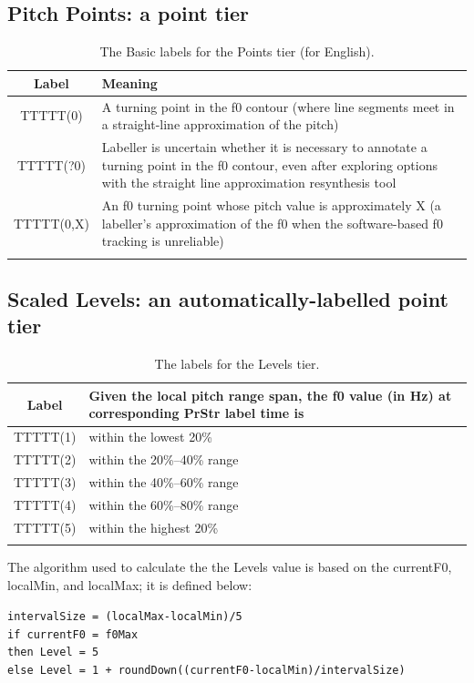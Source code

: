\documentclass[11pt, twoside]{memoir}
\begin{document}
\subsection*{Pitch Points: a point tier}
\begin{longtable}{cp{.8\linewidth}} \toprule \textbf{Label} & \textbf{Meaning} \tabularnewline
\midrule \endhead
TTTTT(0) & A turning point in the f0 contour (where line segments meet in a straight-line approximation of the pitch) \tabularnewline
TTTTT(?0) & Labeller is uncertain whether it is necessary to annotate a turning point in the f0 contour, even after exploring options with the straight line approximation resynthesis tool \tabularnewline
TTTTT(0,X) & An f0 turning point whose pitch value is approximately X (a labeller’s approximation of the f0 when the software-based f0 tracking is unreliable) \tabularnewline
\bottomrule 
\caption{The Basic labels for the Points tier (for English).%
}
\end{longtable}

\subsection*{Scaled Levels: an automatically-labelled point tier}
\begin{longtable}{cp{.8\linewidth}} \toprule
\textbf{Label} & \textbf{Given the local pitch range span, the f0 value (in Hz) at corresponding PrStr label time is} \tabularnewline
\midrule \endhead
TTTTT(1) & within the lowest 20\% \tabularnewline
TTTTT(2) & within the 20\%--40\% range \tabularnewline
TTTTT(3) & within the 40\%--60\% range \tabularnewline
TTTTT(4) & within the 60\%--80\% range \tabularnewline
TTTTT(5) & within the highest 20\% \tabularnewline
\bottomrule 
\caption{The labels for the Levels tier.%
}
\end{longtable}

The algorithm used to calculate the the Levels value is based on the currentF0, localMin, and localMax; it is defined below:
\begin{center}
\parbox{.75\linewidth}{
\texttt{intervalSize = (localMax-localMin)/5}\\
\texttt{if currentF0 = f0Max}\\
	\hspace*{1ex}\texttt{then Level = 5}\\
	\hspace*{1ex}\texttt{else Level = 1 + roundDown((currentF0-localMin)/intervalSize)}}
\end{center}
\end{document}
